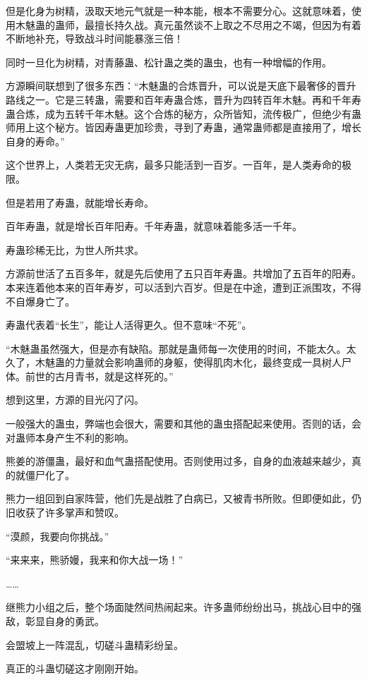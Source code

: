 \begin{this_body}
但是化身为树精，汲取天地元气就是一种本能，根本不需要分心。这就意味着，使用木魅蛊的蛊师，最擅长持久战。真元虽然谈不上取之不尽用之不竭，但因为有着不断地补充，导致战斗时间能暴涨三倍！

同时一旦化为树精，对青藤蛊、松针蛊之类的蛊虫，也有一种增幅的作用。

方源瞬间联想到了很多东西：“木魅蛊的合炼晋升，可以说是天底下最奢侈的晋升路线之一。它是三转蛊，需要和百年寿蛊合炼，晋升为四转百年木魅。再和千年寿蛊合炼，成为五转千年木魅。这个合炼的秘方，众所皆知，流传极广，但绝少有蛊师用上这个秘方。皆因寿蛊更加珍贵，寻到了寿蛊，通常蛊师都是直接用了，增长自身的寿命。”

这个世界上，人类若无灾无病，最多只能活到一百岁。一百年，是人类寿命的极限。

但是若用了寿蛊，就能增长寿命。

百年寿蛊，就是增长百年阳寿。千年寿蛊，就意味着能多活一千年。

寿蛊珍稀无比，为世人所共求。

方源前世活了五百多年，就是先后使用了五只百年寿蛊。共增加了五百年的阳寿。本来连着他本来的百年寿岁，可以活到六百岁。但是在中途，遭到正派围攻，不得不自爆身亡了。

寿蛊代表着“长生”，能让人活得更久。但不意味“不死”。

“木魅蛊虽然强大，但是亦有缺陷。那就是蛊师每一次使用的时间，不能太久。太久了，木魅蛊的力量就会影响蛊师的身躯，使得肌肉木化，最终变成一具树人尸体。前世的古月青书，就是这样死的。”

想到这里，方源的目光闪了闪。

一般强大的蛊虫，弊端也会很大，需要和其他的蛊虫搭配起来使用。否则的话，会对蛊师本身产生不利的影响。

熊姜的游僵蛊，最好和血气蛊搭配使用。否则使用过多，自身的血液越来越少，真的就僵尸化了。

熊力一组回到自家阵营，他们先是战胜了白病已，又被青书所败。但即便如此，仍旧收获了许多掌声和赞叹。

“漠颜，我要向你挑战。”

“来来来，熊骄嫚，我来和你大战一场！”

……

继熊力小组之后，整个场面陡然间热闹起来。许多蛊师纷纷出马，挑战心目中的强敌，彰显自身的勇武。

会盟坡上一阵混乱，切磋斗蛊精彩纷呈。

真正的斗蛊切磋这才刚刚开始。

\end{this_body}

